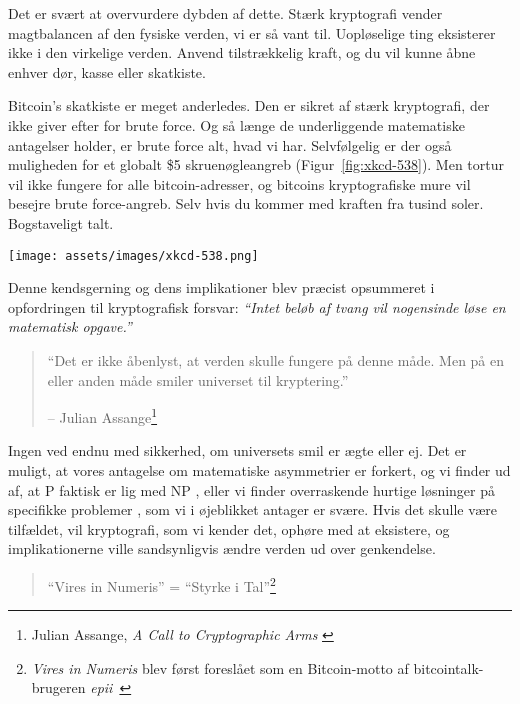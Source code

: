  
  Det er svært at overvurdere dybden af dette. Stærk kryptografi
  vender magtbalancen af den fysiske verden, vi er så vant til.
  Uopløselige ting eksisterer ikke i den virkelige verden. Anvend tilstrækkelig 
  kraft, og du vil kunne åbne enhver dør, kasse eller skatkiste.
  
  Bitcoin's skatkiste er meget anderledes. Den er sikret af stærk
  kryptografi, der ikke giver efter for brute force. Og så længe de
  underliggende matematiske antagelser holder, er brute force alt, hvad vi har.
  Selvfølgelig er der også muligheden for et globalt \$5 skruenøgleangreb 
  (Figur~\ref{fig:xkcd-538}). Men tortur vil ikke fungere for alle 
  bitcoin-adresser, og bitcoins kryptografiske mure vil besejre brute 
  force-angreb. Selv hvis du kommer med kraften fra tusind soler. 
  Bogstaveligt talt.

\begin{center}
  \centering
  \texttt{[image: assets/images/xkcd-538.png]}
  \label{fig:xkcd-538}
\end{center}

Denne kendsgerning og dens implikationer blev præcist opsummeret i opfordringen
til kryptografisk forsvar: \textit{\enquote{Intet beløb af tvang vil 
nogensinde løse en matematisk opgave.}}

\begin{quotation}\begin{samepage}
\enquote{Det er ikke åbenlyst, at verden skulle fungere på denne måde. Men på 
en eller anden måde smiler universet til kryptering.}
\begin{flushright} -- Julian Assange\footnote{Julian Assange, \textit{A Call 
  to Cryptographic Arms} \cite{call-to-cryptographic-arms}}
\end{flushright}\end{samepage}\end{quotation}

Ingen ved endnu med sikkerhed, om universets smil er ægte eller ej. Det
er muligt, at vores antagelse om matematiske asymmetrier er forkert, og
vi finder ud af, at P faktisk er lig med NP \cite{wiki:pnp}, eller vi finder 
overraskende hurtige løsninger på specifikke problemer \cite{wiki:discrete-log}, 
som vi i øjeblikket antager er svære. Hvis det skulle være tilfældet, vil 
kryptografi, som vi kender det, ophøre med at eksistere, og implikationerne 
ville sandsynligvis ændre verden ud over genkendelse.

\begin{quotation}\begin{samepage}
\enquote{Vires in Numeris} = \enquote{Styrke i Tal}\footnote{\textit{Vires in Numeris} blev først foreslået som en Bitcoin-motto af bitcointalk-brugeren \textit{epii}~\cite{epii}}
\end{samepage}\end{quotation}

